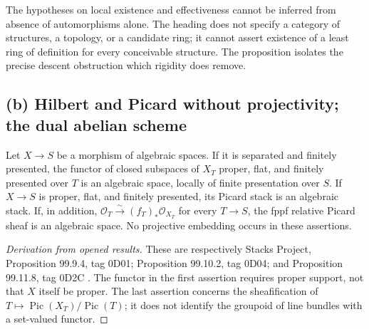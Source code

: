 The hypotheses on local existence and effectiveness cannot be inferred
from absence of automorphisms alone. The heading does not specify a
category of structures, a topology, or a candidate ring; it cannot assert
existence of a least ring of definition for every conceivable structure.
The proposition isolates the precise descent obstruction which rigidity
does remove.

\subsection{(b) Hilbert and Picard without projectivity; the dual abelian scheme}

\begin{theorem}
\label{geo-Kb-HilbPic}
Let $X\to S$ be a morphism of algebraic spaces.
If it is separated and finitely presented, the functor of closed subspaces
of $X_T$ proper, flat, and finitely presented over $T$ is an algebraic space,
locally of finite presentation over $S$.
If $X\to S$ is proper, flat, and finitely presented, its Picard stack is an
algebraic stack. If, in addition,
$\mathcal O_T\xrightarrow{\sim}(f_T)_*\mathcal O_{X_T}$ for every $T\to S$,
the fppf relative Picard sheaf is an algebraic space.
No projective embedding occurs in these assertions.
\end{theorem}
\begin{proof}[Derivation from opened results]
These are respectively Stacks Project, Proposition 99.9.4, tag 0D01;
Proposition 99.10.2, tag 0D04; and Proposition 99.11.8, tag 0D2C
\cite{geoStacksHilbert,geoStacksPicStack,geoStacksPicSpace}.
The functor in the first assertion requires proper support, not that $X$
itself be proper. The last assertion concerns the sheafification of
$T\mapsto\operatorname{Pic}(X_T)/\operatorname{Pic}(T)$; it does not
identify the groupoid of line bundles with a set-valued functor.
\end{proof}

